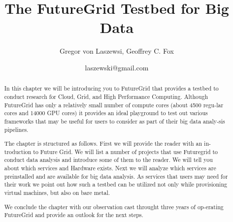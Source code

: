 \documentclass{article}
\begin{document}
\title{The FutureGrid Testbed for Big Data}
\author{Gregor von Laszewsi, Geoffrey C. Fox}
\date{laszewski@gmail.com}

\maketitle



\begin{abstract}

In this chapter we will be introducing you to FutureGrid that provides a testbed to conduct research for Cloud, Grid, and High Performance Computing. Although FutureGrid has only a relatively small number of compute cores (about 4500 regu-lar cores and 14000 GPU cores) it provides an ideal playground to test out various frameworks that may be useful for users to consider as part of their big data analy-sis pipelines. 

The chapter is structured as follows. First we will provide the reader with an in-troduction to Future Grid. We will list a number of projects that use Futuregrid to conduct data analysis and introduce some of them to the reader. We will tell you about which services and Hardware exists. Next we will analyze which services are preinstalled and are available for big data analysis. As services that users may need for their work we point out how such a testbed can be utilized not only while provisioning virtual machines, but also on bare metal. 

We conclude the chapter with our observation cast throught three years of op-erating FutureGrid and provide an outlook for the next steps.
\end{abstract}
\end{document}
